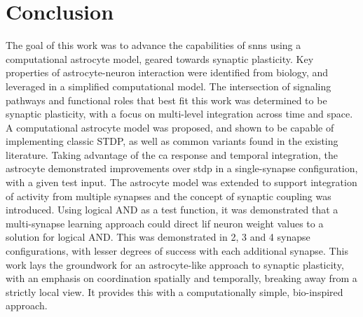 \documentclass[conference]{IEEEtran}
\newcommand{\ca}{\gls{ca}\textrm{ }}
\begin{document}
\section{Conclusion} \label{section:conclusion}
The goal of this work was to advance the capabilities of \glspl{snn} using a
computational astrocyte model, geared towards synaptic plasticity. Key
properties of astrocyte-neuron interaction were identified from biology, and
leveraged in a simplified computational model. The intersection of signaling
pathways and functional roles that best fit this work was determined to be
synaptic plasticity, with a focus on multi-level integration across time and
space. A computational astrocyte model was proposed, and shown to be capable of
implementing classic STDP, as well as common variants found in the existing
literature. Taking advantage of the \ca response and temporal integration, the
astrocyte demonstrated improvements over \gls{stdp} in a single-synapse
configuration, with a given test input. The astrocyte model was extended to
support integration of activity from multiple synapses and the concept of
synaptic coupling was introduced. Using logical AND as a test function, it was
demonstrated that a multi-synapse learning approach could direct \gls{lif}
neuron weight values to a solution for logical AND. This was demonstrated in 2,
3 and 4 synapse configurations, with lesser degrees of success with each
additional synapse. This work lays the groundwork for an astrocyte-like approach
to synaptic plasticity, with an emphasis on coordination spatially and
temporally, breaking away from a strictly local view. It provides this with a
computationally simple, bio-inspired approach.



\renewcommand*{\bibfont}{\small}

\printbibliography[heading=bibintoc]
\end{document}
